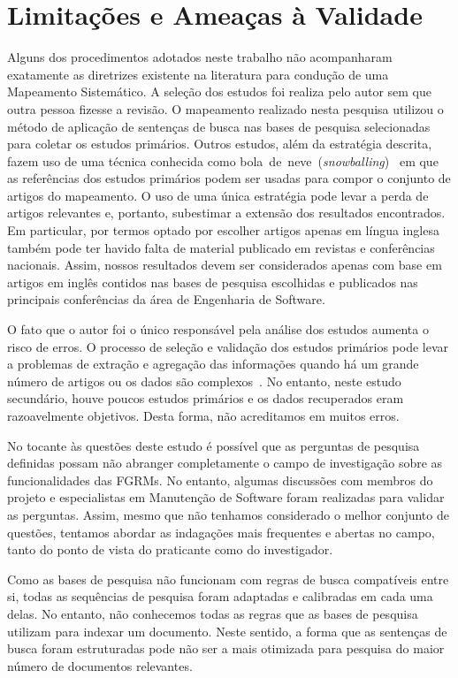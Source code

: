 \section{Limitações e Ameaças à Validade}
\label{sec:map_limitacoes_ameacas}

Alguns dos procedimentos adotados neste trabalho não acompanharam exatamente as
diretrizes existente na literatura para condução de uma Mapeamento Sistemático.
A seleção dos estudos foi realiza pelo autor sem que outra pessoa fizesse a
revisão. O mapeamento realizado nesta pesquisa utilizou o método de aplicação
de sentenças de busca nas bases de pesquisa selecionadas para coletar os
estudos primários. Outros estudos, além da estratégia descrita, fazem uso de
uma técnica conhecida como
bola~de~neve~(\textit{snowballing})~\cite{wohlin2014guidelines} em que as
referências dos estudos primários podem ser usadas para compor o conjunto de
artigos do mapeamento. O uso de uma única estratégia pode levar a perda de
artigos relevantes e, portanto, subestimar a extensão dos resultados
encontrados. Em particular, por termos optado por escolher artigos apenas em
língua inglesa também pode ter havido falta de material publicado em revistas e
conferências nacionais. Assim, nossos resultados devem ser considerados apenas
com base em artigos em inglês contidos nas bases de pesquisa escolhidas e
publicados nas principais conferências da área de Engenharia de Software.

O fato que o autor foi o único responsável pela análise dos estudos aumenta o
risco de erros. O processo de seleção e validação dos estudos primários pode
levar a problemas de extração e agregação das informações quando há um grande
número de artigos ou os dados são complexos~\cite{keele2007guidelines}. No
entanto, neste estudo secundário, houve poucos estudos primários e os dados
recuperados eram razoavelmente objetivos. Desta forma, não acreditamos em
muitos erros.

No tocante às questões deste estudo é possível que as perguntas de pesquisa
definidas possam não abranger completamente o campo de investigação sobre as
funcionalidades das FGRMs. No entanto, algumas discussões com membros do
projeto e especialistas em Manutenção de Software foram realizadas para validar
as perguntas. Assim, mesmo que não tenhamos considerado o melhor conjunto de
questões, tentamos abordar as indagações mais frequentes e abertas no campo,
tanto do ponto de vista do praticante como do investigador.

Como as bases de pesquisa não funcionam com regras de busca compatíveis entre
si, todas as sequências de pesquisa foram adaptadas e calibradas em cada uma
delas. No entanto, não conhecemos todas as regras que as bases de pesquisa
utilizam para indexar um documento. Neste sentido, a forma que as sentenças de
busca foram estruturadas pode não ser a mais otimizada para pesquisa do maior
número de documentos relevantes.

